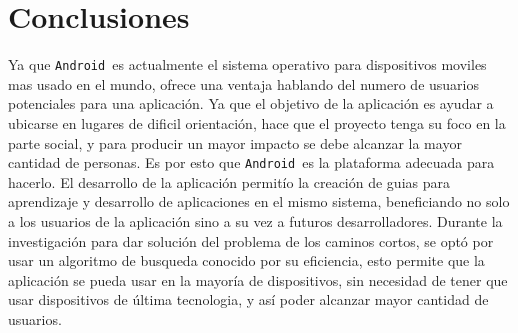 \documentclass[journal]{IEEEtran}
\newcommand{\andr}{\texttt{Android~}}
\begin{document}
\section{Conclusiones}
Ya que \andr es actualmente el sistema operativo para dispositivos moviles mas usado en el mundo, ofrece una ventaja hablando del numero de usuarios potenciales para una aplicación. Ya que el objetivo de la aplicación es ayudar a ubicarse en lugares de dificil orientación, hace que el proyecto tenga su foco en la parte social, y para producir un mayor impacto se debe alcanzar la mayor cantidad de personas. Es por esto que \andr es la plataforma adecuada para hacerlo.
El desarrollo de la aplicación permitío la creación de guias para aprendizaje y desarrollo de aplicaciones en el mismo sistema, beneficiando no solo a los usuarios de la aplicación sino a su vez a futuros desarrolladores. Durante la investigación para dar solución del problema de los caminos cortos, se optó por usar un algoritmo de busqueda conocido por su eficiencia, esto permite que la aplicación se pueda usar en la mayoría de dispositivos, sin necesidad de tener que usar dispositivos de última tecnologia, y así poder alcanzar mayor cantidad de usuarios.
\end{document}
